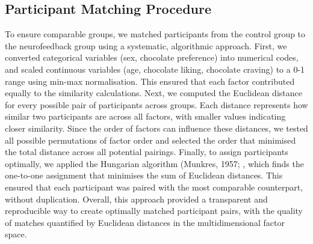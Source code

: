 \documentclass[]{imag-ms-template}
\begin{document}
\subsection*{Participant Matching Procedure}
To ensure comparable groups, we matched participants from the control group to the neurofeedback group using a systematic, algorithmic approach. First, we converted categorical variables (sex, chocolate preference) into numerical codes, and scaled continuous variables (age, chocolate liking, chocolate craving) to a 0-1 range using min-max normalisation. This ensured that each factor contributed equally to the similarity calculations.
Next, we computed the Euclidean distance for every possible pair of participants across groups. Each distance represents how similar two participants are across all factors, with smaller values indicating closer similarity. Since the order of factors can influence these distances, we tested all possible permutations of factor order and selected the order that minimised the total distance across all potential pairings.
Finally, to assign participants optimally, we applied the Hungarian algorithm (Munkres, 1957; %
, which finds the one-to-one assignment that minimises the sum of Euclidean distances. This ensured that each participant was paired with the most comparable counterpart, without duplication.
Overall, this approach provided a transparent and reproducible way to create optimally matched participant pairs, with the quality of matches quantified by Euclidean distances in the multidimensional factor space.
\end{document}
